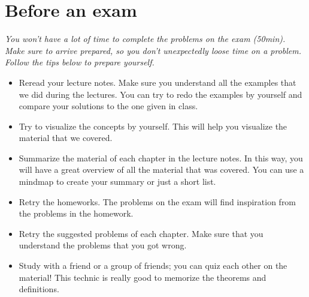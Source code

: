\documentclass[12pt]{amsart}
\begin{document}
\section*{Before an exam}
\textit{You won't have a lot of time to complete the problems on the exam (50min). Make sure to arrive prepared, so you don't unexpectedly loose time on a problem. Follow the tips below to prepare yourself.}
	\begin{itemize}
	\item Reread your lecture notes. Make sure you understand all the examples that we did during the lectures. You can try to redo the examples by yourself and compare your solutions to the one given in class. 
	\item Try to visualize the concepts by yourself. This will help you visualize the material that we covered.
	\item Summarize the material of each chapter in the lecture notes. In this way, you will have a great overview of all the material that was covered. You can use a mindmap to create your summary or just a short list.
	\item Retry the homeworks. The problems on the exam will find inspiration from the problems in the homework.
	\item Retry the suggested problems of each chapter. Make sure that you understand the problems that you got wrong. 
	\item Study with a friend or a group of friends; you can quiz each other on the material! This technic is really good to memorize the theorems and definitions.
	\end{itemize}
\end{document}
